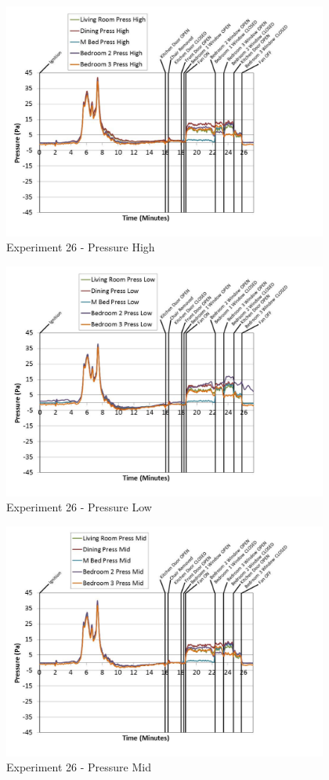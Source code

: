 \documentclass{article}
\begin{document}
\begin{appendices}
	\begin{figure}[h!]
		\centering
		\includegraphics[height=3.05in]{0_Images/Results_Charts/Exp_26_Charts/PressureHigh.pdf}
		\caption{Experiment 26 - Pressure High}
	\end{figure}
 
	\clearpage

	\begin{figure}[h!]
		\centering
		\includegraphics[height=3.05in]{0_Images/Results_Charts/Exp_26_Charts/PressureLow.pdf}
		\caption{Experiment 26 - Pressure Low}
	\end{figure}
 

	\begin{figure}[h!]
		\centering
		\includegraphics[height=3.05in]{0_Images/Results_Charts/Exp_26_Charts/PressureMid.pdf}
		\caption{Experiment 26 - Pressure Mid}
	\end{figure}
 

\end{appendices}
\end{document}
